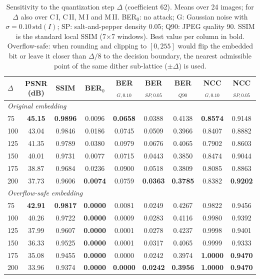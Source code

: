 \begin{table}[t]
\centering
\caption{Sensitivity to the quantization step $\Delta$ (coefficient 62). Means over 24 images; for $\Delta$ also over C\,I, C\,II, M\,I and M\,II. BER$_0$: no attack; G: Gaussian noise with $\sigma = 0.10\,\mathrm{std}(I)$; SP: salt-and-pepper density 0.05; Q90: JPEG quality 90. SSIM is the standard local SSIM (7$\times$7 windows). Best value per column in bold. Overflow-safe: when rounding and clipping to $[0,255]$ would flip the embedded bit or leave it closer than $\Delta/8$ to the decision boundary, the nearest admissible point of the same dither sub-lattice ($\pm\Delta$) is used.}
\label{tab:delta_sensitivity}
\setlength{\tabcolsep}{3pt}
\footnotesize
\begin{tabular}{lcccccccc}
\toprule
$\Delta$ & PSNR (dB) & SSIM & BER$_{0}$ & BER$_{G,0.10}$ & BER$_{SP,0.05}$ & BER$_{Q90}$ & NCC$_{G,0.10}$ & NCC$_{SP,0.05}$ \\
\midrule
\multicolumn{9}{l}{\emph{Original embedding}} \\
75 & \textbf{45.15} & \textbf{0.9896} & 0.0096 & \textbf{0.0658} & 0.0388 & 0.4138 & \textbf{0.8574} & 0.9148 \\
100 & 43.04 & 0.9846 & 0.0186 & 0.0745 & 0.0509 & 0.3966 & 0.8407 & 0.8882 \\
125 & 41.35 & 0.9789 & 0.0380 & 0.0979 & 0.0676 & 0.4065 & 0.7902 & 0.8603 \\
150 & 40.01 & 0.9731 & 0.0077 & 0.0715 & 0.0443 & 0.3850 & 0.8474 & 0.9044 \\
175 & 38.87 & 0.9684 & 0.0236 & 0.0900 & 0.0518 & 0.3809 & 0.8085 & 0.8863 \\
200 & 37.73 & 0.9606 & \textbf{0.0074} & 0.0759 & \textbf{0.0363} & \textbf{0.3785} & 0.8382 & \textbf{0.9202} \\
\midrule
\multicolumn{9}{l}{\emph{Overflow-safe embedding}} \\
75 & \textbf{42.91} & \textbf{0.9817} & \textbf{0.0000} & 0.0081 & 0.0249 & 0.4267 & 0.9822 & 0.9456 \\
100 & 40.26 & 0.9722 & \textbf{0.0000} & 0.0009 & 0.0283 & 0.4116 & 0.9980 & 0.9392 \\
125 & 37.99 & 0.9607 & \textbf{0.0000} & 0.0001 & 0.0278 & 0.4237 & 0.9998 & 0.9401 \\
150 & 36.33 & 0.9525 & \textbf{0.0000} & 0.0001 & 0.0317 & 0.4065 & 0.9999 & 0.9333 \\
175 & 35.08 & 0.9455 & \textbf{0.0000} & 0.0000 & 0.0242 & 0.3974 & \textbf{1.0000} & \textbf{0.9470} \\
200 & 33.96 & 0.9374 & \textbf{0.0000} & \textbf{0.0000} & \textbf{0.0242} & \textbf{0.3956} & \textbf{1.0000} & \textbf{0.9470} \\
\bottomrule
\end{tabular}
\end{table}
